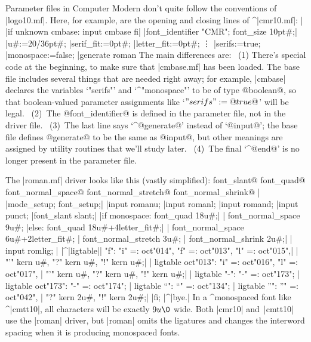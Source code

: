 Parameter files in Computer Modern don't quite follow the conventions
of\/ |logo10.mf|. Here, for example, are the
opening and closing lines of ^|cmr10.mf|:
\beginlines
|%
|if unknown cmbase: input cmbase fi|
\smallskip
|font_identifier "CMR"; font_size 10pt#;|
\smallskip
|u#:=20/36pt#;                %
|serif_fit:=0pt#;             %
|letter_fit:=0pt#;            %
\vskip-3pt
\qquad\vdots
|serifs:=true;                %
|monospace:=false;            %
\smallskip
|generate roman               %
\endlines
The main differences are: \ (1) There's special code at the beginning, to
make sure that |cmbase.mf| has been loaded. The base file includes
several things that are needed right away; for example, |cmbase| declares
the variables `"serifs"' and `^"monospace"' to be of type @boolean@,
so that boolean-valued parameter assignments like `$"serifs":=@true@$'
will be legal. \ (2)~The @font\_identifier@ is defined in the parameter file,
not in the driver file. \ (3)~The last line says `^@generate@' instead of
`@input@'; the base file defines @generate@ to be the same as @input@,
but other meanings are assigned by utility routines that we'll study later.
\ (4)~The final `^@end@' is no longer present in the parameter file.

The |roman.mf| driver looks like this (vastly simplified):
^^@font\_slant@ ^^@font\_quad@ ^^@font\_normal\_space@
^^@font\_normal\_stretch@ ^^@font\_normal\_shrink@
\beginlines
|%
\smallskip
|mode_setup; font_setup;|
\smallskip
|input romanu;                         %
|input romanl;                         %
|input romand;                         %
|input punct;                          %
\smallskip
|font_slant slant;|
|if monospace: font_quad 18u#;|
| font_normal_space 9u#;               %
|else: font_quad 18u#+4letter_fit#;|
| font_normal_space 6u#+2letter_fit#;  %
| font_normal_stretch 3u#;             %
| font_normal_shrink 2u#;|
| input romlig;                        %
| |^|ligtable|| "f": "i" =: oct"014", "f" =: oct"013", "l" =: oct"015",|
|            "'" kern u#, "?" kern u#, "!" kern u#;|
| ligtable oct"013": "i" =: oct"016", "l" =: oct"017",   %
|            "'" kern u#, "?" kern u#, "!" kern u#;|
| ligtable "-": "-" =: oct"173";                         %
| ligtable oct"173": "-" =: oct"174";                    %
| ligtable "`": "`" =: oct"134";                         %
| ligtable "'": "'" =: oct"042",                         %
|            "?" kern 2u#, "!" kern 2u#;|
|fi; |^|bye.|
\endlines
In a ^{monospaced} font like ^|cmtt10|, all characters will be exactly
$9u\0$ wide. Both |cmr10| and~|cmtt10| use the |roman| driver, but
|roman| omits the ligatures and changes the interword spacing
when it is producing monospaced fonts.


